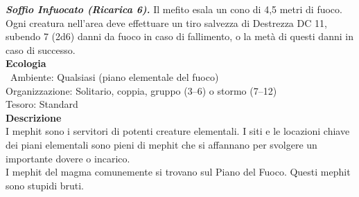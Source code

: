 \begin{multicols}{2}
\emph{\textbf{Soffio Infuocato (Ricarica 6).}} Il mefito esala un cono di 4,5 metri di fuoco. Ogni creatura nell'area deve effettuare un tiro salvezza di Destrezza DC 11, subendo 7 (2d6) danni da fuoco in caso di fallimento, o la metà di questi danni in caso di successo.\\
\textbf{Ecologia}\\\
Ambiente: Qualsiasi (piano elementale del fuoco)\\
Organizzazione: Solitario, coppia, gruppo (3–6) o stormo (7–12)\\
Tesoro: Standard\\
\textbf{Descrizione}\\
I mephit sono i servitori di potenti creature elementali. I siti e le locazioni chiave dei piani elementali sono pieni di mephit che si affannano per svolgere un importante dovere o incarico.\\
I mephit del magma comunemente si trovano sul Piano del Fuoco. Questi mephit sono stupidi bruti.\\



\end{multicols}

